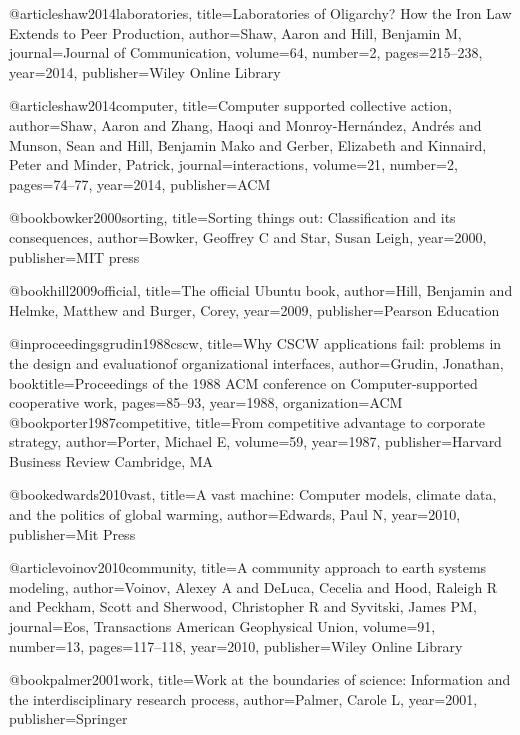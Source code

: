 @article{shaw2014laboratories,
  title={Laboratories of Oligarchy? How the Iron Law Extends to Peer Production},
  author={Shaw, Aaron and Hill, Benjamin M},
  journal={Journal of Communication},
  volume={64},
  number={2},
  pages={215--238},
  year={2014},
  publisher={Wiley Online Library}
}

@article{shaw2014computer,
  title={Computer supported collective action},
  author={Shaw, Aaron and Zhang, Haoqi and Monroy-Hern{\'a}ndez, Andr{\'e}s and Munson, Sean and Hill, Benjamin Mako and Gerber, Elizabeth and Kinnaird, Peter and Minder, Patrick},
  journal={interactions},
  volume={21},
  number={2},
  pages={74--77},
  year={2014},
  publisher={ACM}
}

@book{bowker2000sorting,
  title={Sorting things out: Classification and its consequences},
  author={Bowker, Geoffrey C and Star, Susan Leigh},
  year={2000},
  publisher={MIT press}
}

@book{hill2009official,
  title={The official Ubuntu book},
  author={Hill, Benjamin and Helmke, Matthew and Burger, Corey},
  year={2009},
  publisher={Pearson Education}
}

@inproceedings{grudin1988cscw,
  title={Why CSCW applications fail: problems in the design and evaluationof organizational interfaces},
  author={Grudin, Jonathan},
  booktitle={Proceedings of the 1988 ACM conference on Computer-supported cooperative work},
  pages={85--93},
  year={1988},
  organization={ACM}
}
@book{porter1987competitive,
  title={From competitive advantage to corporate strategy},
  author={Porter, Michael E},
  volume={59},
  year={1987},
  publisher={Harvard Business Review Cambridge, MA}
}

@book{edwards2010vast,
  title={A vast machine: Computer models, climate data, and the politics of global warming},
  author={Edwards, Paul N},
  year={2010},
  publisher={Mit Press}
}

@article{voinov2010community,
  title={A community approach to earth systems modeling},
  author={Voinov, Alexey A and DeLuca, Cecelia and Hood, Raleigh R and Peckham, Scott and Sherwood, Christopher R and Syvitski, James PM},
  journal={Eos, Transactions American Geophysical Union},
  volume={91},
  number={13},
  pages={117--118},
  year={2010},
  publisher={Wiley Online Library}
}


@book{palmer2001work,
  title={Work at the boundaries of science: Information and the interdisciplinary research process},
  author={Palmer, Carole L},
  year={2001},
  publisher={Springer}
}

